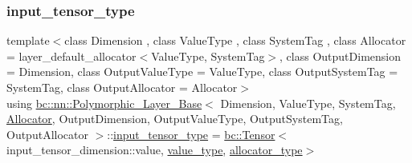 \subsubsection{\texorpdfstring{input\+\_\+tensor\+\_\+type}{input\_tensor\_type}\hspace{0.1cm}{\footnotesize\ttfamily [2/2]}}
{\footnotesize\ttfamily template$<$class Dimension , class Value\+Type , class System\+Tag , class Allocator  = layer\+\_\+default\+\_\+allocator$<$\+Value\+Type, System\+Tag$>$, class Output\+Dimension  = Dimension, class Output\+Value\+Type  = Value\+Type, class Output\+System\+Tag  = System\+Tag, class Output\+Allocator  = Allocator$>$ \\
using \hyperlink{structbc_1_1nn_1_1Polymorphic__Layer__Base}{bc\+::nn\+::\+Polymorphic\+\_\+\+Layer\+\_\+\+Base}$<$ Dimension, Value\+Type, System\+Tag, \hyperlink{classbc_1_1allocators_1_1Allocator}{Allocator}, Output\+Dimension, Output\+Value\+Type, Output\+System\+Tag, Output\+Allocator $>$\+::\hyperlink{structbc_1_1nn_1_1Polymorphic__Layer__Base_accd9d828714e1abe620fa89aa1556757}{input\+\_\+tensor\+\_\+type} =  \hyperlink{namespacebc_a659391e47ab612be3ba6c18cf9c89159}{bc\+::\+Tensor}$<$ input\+\_\+tensor\+\_\+dimension\+::value, \hyperlink{structbc_1_1nn_1_1Polymorphic__Layer__Base_aa7d46845ee0a4544003a6f8fe3b7f52a}{value\+\_\+type}, \hyperlink{structbc_1_1nn_1_1Polymorphic__Layer__Base_a1414f8c37dea6254aebf63e4486ed818}{allocator\+\_\+type}$>$}

\mbox{\label{structbc_1_1nn_1_1Polymorphic__Layer__Base_a6f8d2b06bb46d0ef96d0857df2544731}} 
